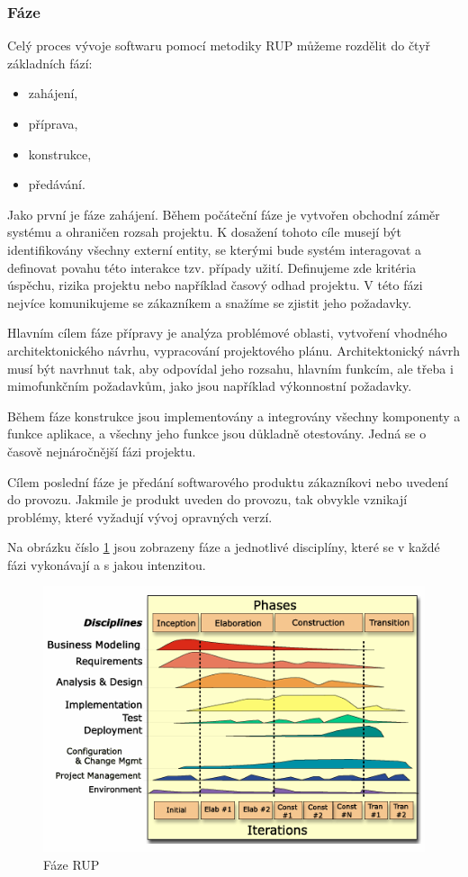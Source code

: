 \documentclass[czech,DP]{thesiskiv}
\begin{document}
\subsubsection{Fáze}
Celý proces vývoje softwaru pomocí metodiky RUP můžeme rozdělit do čtyř základních fází:
\begin{itemize}
    \item zahájení,
    \item příprava,
    \item konstrukce,
    \item předávání.
\end{itemize}
Jako první je fáze zahájení. Během počáteční fáze je vytvořen obchodní záměr systému a ohraničen rozsah projektu. K dosažení tohoto cíle musejí být identifikovány všechny externí entity, se kterými bude systém interagovat a
definovat povahu této interakce tzv. případy užití. Definujeme zde kritéria úspěchu, rizika projektu nebo například časový odhad projektu. V této fázi nejvíce komunikujeme se zákazníkem a snažíme se zjistit jeho požadavky.
\par
Hlavním cílem fáze přípravy je analýza problémové oblasti, vytvoření vhodného architektonického návrhu, vypracování projektového plánu. Architektonický návrh musí být navrhnut tak, aby odpovídal jeho rozsahu, hlavním funkcím, ale třeba i mimofunkčním požadavkům, jako jsou
například výkonnostní požadavky.
\par
Během fáze konstrukce jsou implementovány a integrovány všechny komponenty a funkce aplikace, a všechny jeho funkce jsou důkladně otestovány. Jedná se o časově nejnáročnější fázi projektu.
\par
Cílem poslední fáze je předání softwarového produktu zákazníkovi nebo uvedení do provozu. Jakmile je produkt uveden do provozu, tak obvykle vznikají problémy, které vyžadují vývoj opravných verzí.\cite{RUPbook}
\par
Na obrázku číslo \ref{img:RUP} jsou zobrazeny fáze a jednotlivé disciplíny, které se v každé fázi vykonávají a s jakou intenzitou.
\begin{figure}[!htb]
    \centering
    \includegraphics[width=380pt]{img/rup.png}
    \caption{Fáze RUP \cite{RUPbook}}
    \label{img:RUP}
\end{figure}
\FloatBarrier
\end{document}
